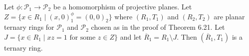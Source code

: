 Let $\phi : \mathcal{P}_1 \to \mathcal{P}_2$ be a homomorphism of projective planes. Let $Z = \{ x \in R_1 \mid (x, 0)_1^\phi = (0, 0)_2 \}$ where $(R_1, T_1)$ and $(R_2, T_2)$ are planar ternary rings for $\mathcal{P}_1$ and $\mathcal{P}_2$ chosen as in the proof of Theorem 6.21. Let $J = \{ x \in R_1 \mid xz = 1 \text{ for some } z \in Z \}$ and let $\overline{R}_1 = R_1 \setminus J$. Then $(\overline{R}_1, T_1)$ is a ternary ring.
